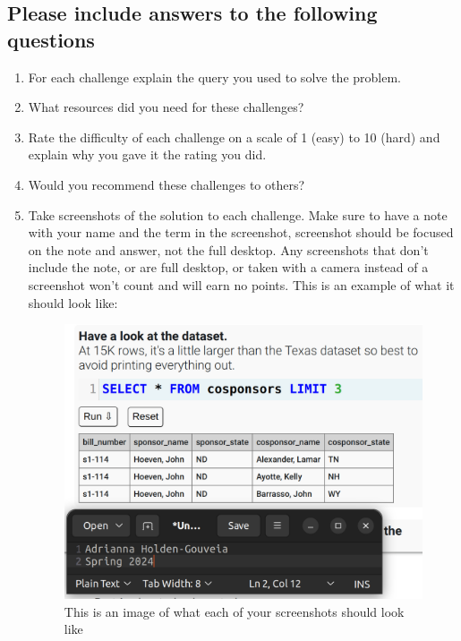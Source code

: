 \documentclass[12pt]{article}
\begin{document}
\subsection*{Please include answers to the following questions}
    \begin{enumerate}
        \item For each challenge explain the query you used to solve the problem.
        \item What resources did you need for these challenges?
        \item Rate the difficulty of each challenge on a scale of 1 (easy) to 10 (hard) and explain why you gave it the rating you did.
        \item Would you recommend these challenges to others? 
        \item Take screenshots of the solution to each challenge. Make sure to have a note with your name and the term in the screenshot, screenshot should be focused on the note and answer, not the full desktop.  Any screenshots that don't include the note, or are full desktop, or taken with a camera instead of a screenshot won't count and will earn no points. This is an example of what it should look like:        
 
        \begin{figure}[h!]
            \centerline{\includegraphics[scale=.2]{Examplewk6.png}}
            \caption{This is an image of what each of your screenshots should look like}

            \end{figure} 
    \end{enumerate}
\end{document}
